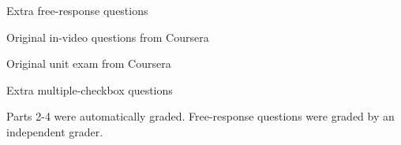 \documentclass{chi-ext}
\begin{document}
\begin{compactenum}
\item Extra free-response questions %
\item Original in-video questions from Coursera%
\item Original unit exam from Coursera%
\item Extra multiple-checkbox questions %
\end{compactenum}

Parts 2-4 were automatically graded. Free-response questions were graded by an independent grader.




\end{document}
